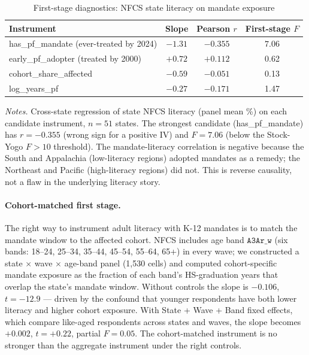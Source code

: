 \documentclass[12pt]{article}
\begin{document}
\begin{table}[h]
\centering
\caption{First-stage diagnostics: NFCS state literacy on mandate exposure}
\label{tab:fs_iv}
\footnotesize
\begin{tabular}{lccc}
\toprule
Instrument & Slope & Pearson $r$ & First-stage $F$ \\
\midrule
has\_pf\_mandate (ever-treated by 2024) & $-1.31$ & $\mathbf{-0.355}$ & $\mathbf{7.06}$ \\
early\_pf\_adopter (treated by 2000) & $+0.72$ & $+0.112$ & 0.62 \\
cohort\_share\_affected & $-0.59$ & $-0.051$ & 0.13 \\
log\_years\_pf & $-0.27$ & $-0.171$ & 1.47 \\
\bottomrule
\end{tabular}

\medskip
{\footnotesize\textit{Notes.} Cross-state regression of state NFCS literacy (panel mean \%) on each candidate instrument, $n = 51$ states. The strongest candidate (has\_pf\_mandate) has $r = -0.355$ (wrong sign for a positive IV) and $F = 7.06$ (below the Stock-Yogo $F > 10$ threshold). The mandate-literacy correlation is negative because the South and Appalachia (low-literacy regions) adopted mandates as a remedy; the Northeast and Pacific (high-literacy regions) did not. This is reverse causality, not a flaw in the underlying literacy story.}
\end{table}

\paragraph{Cohort-matched first stage.} The right way to instrument adult literacy with K-12 mandates is to match the mandate window to the affected cohort. NFCS includes age band $\mathtt{A3Ar\_w}$ (six bands: 18--24, 25--34, 35--44, 45--54, 55--64, 65+) in every wave; we constructed a state $\times$ wave $\times$ age-band panel (1{,}530 cells) and computed cohort-specific mandate exposure as the fraction of each band's HS-graduation years that overlap the state's mandate window. Without controls the slope is $-0.106$, $t = -12.9$ --- driven by the confound that younger respondents have both lower literacy and higher cohort exposure. With State + Wave + Band fixed effects, which compare like-aged respondents across states and waves, the slope becomes $+0.002$, $t = +0.22$, partial $F = 0.05$. The cohort-matched instrument is no stronger than the aggregate instrument under the right controls.
\end{document}
